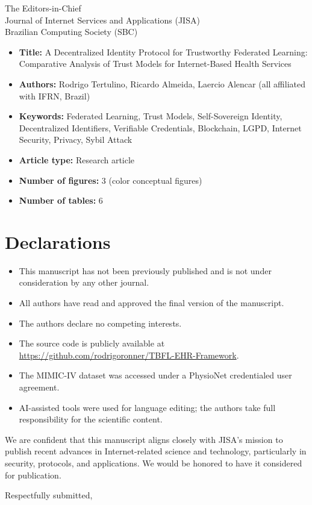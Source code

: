 \documentclass[11pt]{letter}
\begin{document}
\begin{letter}{The Editors-in-Chief \\
Journal of Internet Services and Applications (JISA) \\
Brazilian Computing Society (SBC)}
\begin{itemize}
  \item \textbf{Title:} A Decentralized Identity Protocol for Trustworthy Federated Learning: Comparative Analysis of Trust Models for Internet-Based Health Services
  \item \textbf{Authors:} Rodrigo Tertulino, Ricardo Almeida, Laercio Alencar (all affiliated with IFRN, Brazil)
  \item \textbf{Keywords:} Federated Learning, Trust Models, Self-Sovereign Identity, Decentralized Identifiers, Verifiable Credentials, Blockchain, LGPD, Internet Security, Privacy, Sybil Attack
  \item \textbf{Article type:} Research article
  \item \textbf{Number of figures:} 3 (color conceptual figures)
  \item \textbf{Number of tables:} 6
\end{itemize}

\section*{Declarations}

\begin{itemize}
  \item This manuscript has not been previously published and is not under consideration by any other journal.
  \item All authors have read and approved the final version of the manuscript.
  \item The authors declare no competing interests.
  \item The source code is publicly available at \url{https://github.com/rodrigoronner/TBFL-EHR-Framework}.
  \item The MIMIC-IV dataset was accessed under a PhysioNet credentialed user agreement.
  \item AI-assisted tools were used for language editing; the authors take full responsibility for the scientific content.
\end{itemize}

We are confident that this manuscript aligns closely with JISA's mission to publish recent advances in Internet-related science and technology, particularly in security, protocols, and applications. We would be honored to have it considered for publication.

\closing{Respectfully submitted,}

\end{letter}
\end{document}
